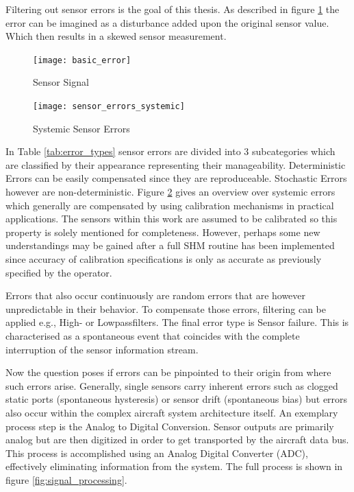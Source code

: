 Filtering out sensor errors is the goal of this thesis. As described in figure \ref{fig:basic_error} the error can be imagined as a disturbance added upon the original sensor value. Which then results in a skewed sensor measurement.

\begin{figure}[ht]
    \centering
    \texttt{[image: basic\_error]}
    \caption{Sensor Signal}
    \label{fig:basic_error}
\end{figure}


\begin{figure}
    \centering
    \vspace{-20pt}
    \texttt{[image: sensor\_errors\_systemic]}
    \caption{Systemic Sensor Errors \cite{hartmann_navigation-sensordatenfusion_2022, din_din_1995}}
    \label{fig:sensor_errors_systemic}
\end{figure}

In Table \ref{tab:error_types} sensor errors are divided into 3 subcategories which are classified by their appearance representing their manageability. Deterministic Errors can be easily compensated since they are reproduceable. Stochastic Errors however are non-deterministic. Figure \ref{fig:sensor_errors_systemic} gives an overview over systemic errors which generally are compensated by using calibration mechanisms in practical applications. The sensors within this work are assumed to be calibrated so this property is solely mentioned for completeness. However, perhaps some new understandings may be gained after a full SHM routine has been implemented since accuracy of calibration specifications is only as accurate as previously specified by the operator.

Errors that also occur continuously are random errors that are however unpredictable in their behavior. To compensate those errors, filtering can be applied e.g., High- or Lowpassfilters. The final error type is Sensor failure. This is characterised as a spontaneous event that coincides with the complete interruption of the sensor information stream.


Now the question poses if errors can be pinpointed to their origin from where such errors arise. Generally, single sensors carry inherent errors such as clogged static ports (spontaneous hysteresis) or sensor drift (spontaneous bias) but errors also occur within the complex aircraft system architecture itself. An exemplary process step is the Analog to Digital Conversion. Sensor outputs are primarily analog but are then digitized in order to get transported by the aircraft data bus. This process is accomplished using an Analog Digital Converter (ADC), effectively eliminating information from the system. The full process is shown in figure \ref{fig:signal_processing}.

